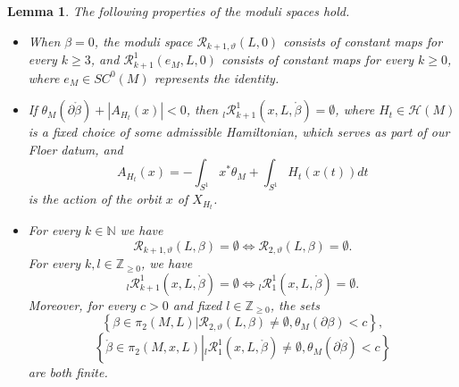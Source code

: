 \documentclass[a4paper]{article}
\newtheorem{lemma}[theorem]{Lemma}
\numberwithin{equation}{section}
\begin{document}
\begin{lemma}\label{lemma:basic}
The following properties of the moduli spaces hold.
\begin{itemize}
	\item[(i)] When $\beta=0$, the moduli space $\mathcal{R}_{k+1,\vartheta}(L,0)$ consists of constant maps for every $k\geq3$, and $\mathcal{R}_{k+1}^1(e_M,L,0)$ consists of constant maps for every $k\geq0$, where $e_M\in\mathit{SC}^0(M)$ represents the identity.
	\item[(ii)] If $\theta_M(\partial\ring{\beta})+|A_{H_t}(x)|<0$, then ${}_l\mathcal{R}_{k+1}^1(x,L,\ring{\beta})=\emptyset$, where $H_t\in\mathcal{H}(M)$ is a fixed choice of some admissible Hamiltonian, which serves as part of our Floer datum, and
	\begin{equation}
	A_{H_t}(x)=-\int_{S^1}x^\ast\theta_M+\int_{S^1}H_t(x(t))dt
	\end{equation}
	is the action of the orbit $x$ of $X_{H_t}$.
	\item[(iii)] For every $k\in\mathbb{N}$ we have
	\begin{equation}
	\mathcal{R}_{k+1,\vartheta}(L,\beta)=\emptyset\Leftrightarrow\mathcal{R}_{2,\vartheta}(L,\beta)=\emptyset.
	\end{equation}
    For every $k,l\in\mathbb{Z}_{\geq0}$, we have
    \begin{equation}
    {}_l\mathcal{R}_{k+1}^1(x,L,\ring{\beta})=\emptyset\Leftrightarrow{}_l\mathcal{R}_1^1(x,L,\ring{\beta})=\emptyset.
    \end{equation}
    Moreover, for every $c>0$ and fixed $l\in\mathbb{Z}_{\geq0}$, the sets
    \begin{equation}
    \left\{\beta\in\pi_2(M,L)\vert\mathcal{R}_{2,\vartheta}(L,\beta)\neq\emptyset,\theta_M(\partial\beta)<c\right\},
    \end{equation}
    \begin{equation}
    \left\{\ring{\beta}\in\pi_2(M,x,L)\left\vert{}_l\mathcal{R}_1^1(x,L,\ring{\beta})\neq\emptyset,\theta_M(\partial\ring{\beta})<c\right.\right\}
    \end{equation}
    are both finite.
\end{itemize}
\end{lemma}
\end{document}
